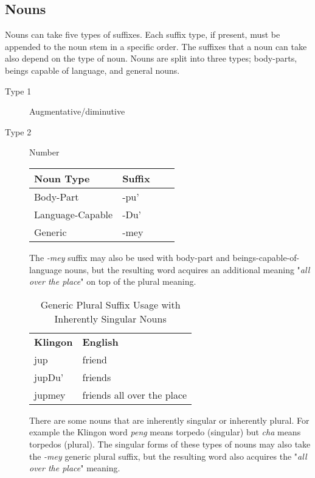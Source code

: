 \documentclass[11pt]{article}
\begin{document}
\subsection {Nouns}

Nouns can take five types of suffixes. Each suffix type, if present, must be appended to the noun stem in a specific order. The suffixes that a noun can take also depend on the type of noun. Nouns are split into three types; body-parts, beings capable of language, and general nouns.

\begin{description}
	\item[Type 1] Augmentative/diminutive
	\item[Type 2] Number

	\begin{center}
	\begin{tabular}{ | l | l | l | l |}
	\hline
	\bf{Noun Type} & \bf{Suffix} \\ \hline
	Body-Part & -pu' \\ \hline
	Language-Capable & -Du' \\ \hline
	Generic & -mey \\
	\hline
	\end{tabular}
	\end{center}
	
	The \textit{-mey} suffix may also be used with body-part and beings-capable-of-language nouns, but the resulting word acquires an additional meaning "\textit{all over the place}" on top of the plural meaning.
	
\begin{table}[h]
\begin{center}
\begin{tabular}{l|l}
\bf Klingon & \bf English \\
jup & friend \\
jupDu' & friends \\
jupmey & friends all over the place \\
\end{tabular}
\end{center}
\caption{Generic Plural Suffix Usage with Inherently Singular Nouns}
\end{table}

	There are some nouns that are inherently singular or inherently plural. For example the Klingon word \textit{peng} means torpedo (singular) but \textit{cha} means torpedos (plural). The singular forms of these types of nouns may also take the \textit{-mey} generic plural suffix, but the resulting word also acquires the "\textit{all over the place}" meaning.
	

\end{description}
\end{document}
